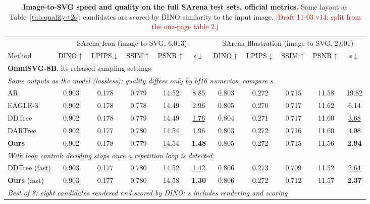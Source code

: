 \begin{table}[t]
\caption{\textbf{Image-to-SVG speed and quality on the full SArena test sets, official metrics.} Same layout as Table~\ref{tab:quality-t2s}; candidates are scored by DINO similarity to the input image. \textcolor{red}{[Draft 11-03 v14: split from the one-page table 2.]}}
\label{tab:quality-i2s}
\centering
\small
\setlength{\tabcolsep}{2.6pt}
\begin{tabular*}{\textwidth}{@{\extracolsep{\fill}}l*{10}{c}@{}}
\toprule
 & \multicolumn{5}{c}{SArena-Icon (image-to-SVG, 6,013)} & \multicolumn{5}{c}{SArena-Illustration (image-to-SVG, 2,001)} \\
\cmidrule(lr){2-6}\cmidrule(lr){7-11}
Method & DINO$\uparrow$ & LPIPS$\downarrow$ & SSIM$\uparrow$ & PSNR$\uparrow$ & s$\downarrow$ & DINO$\uparrow$ & LPIPS$\downarrow$ & SSIM$\uparrow$ & PSNR$\uparrow$ & s$\downarrow$ \\
\midrule
\multicolumn{11}{l}{\textbf{OmniSVG-8B}, its released sampling settings} \\
\multicolumn{11}{l}{\hspace{0.6em}\textit{Same outputs as the model (lossless): quality differs only by bf16 numerics, compare s}} \\
AR & 0.903 & 0.178 & 0.779 & 14.52 & 8.85 & 0.803 & 0.272 & 0.715 & 11.58 & 19.82 \\
EAGLE-3 & 0.902 & 0.178 & 0.778 & 14.49 & 2.96 & 0.805 & 0.270 & 0.717 & 11.62 & 6.14 \\
DDTree & 0.902 & 0.178 & 0.779 & 14.49 & \underline{1.76} & 0.804 & 0.271 & 0.717 & 11.60 & \underline{3.68} \\
DARTree & 0.902 & 0.177 & 0.780 & 14.54 & 1.96 & 0.803 & 0.272 & 0.716 & 11.60 & 4.08 \\
\textbf{Ours} & 0.902 & 0.178 & 0.779 & 14.54 & \textbf{1.48} & 0.805 & 0.272 & 0.715 & 11.56 & \textbf{2.94} \\
\multicolumn{11}{l}{\hspace{0.6em}\textit{With loop control: decoding stops once a repetition loop is detected}} \\
DDTree (fast) & 0.903 & 0.177 & 0.780 & 14.52 & \underline{1.42} & 0.806 & 0.273 & 0.709 & 11.52 & \underline{2.64} \\
\textbf{Ours} (fast) & 0.903 & 0.177 & 0.780 & 14.58 & \textbf{1.30} & 0.806 & 0.272 & 0.712 & 11.57 & \textbf{2.37} \\
\multicolumn{11}{l}{\hspace{0.6em}\textit{Best of 8: eight candidates rendered and scored by DINO; s includes rendering and scoring}} \\

\end{tabular*}
\end{table}
